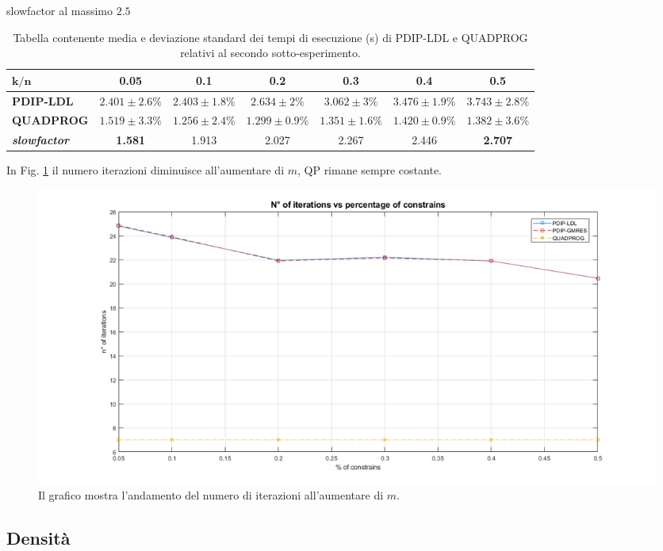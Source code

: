 slowfactor al massimo $2.5$

\begin{table}[!h]
\centering
\begin{tabular}{l|c|c|c|c|c|c}

$\mathbf{k/n}$            & \textbf{0.05} & \textbf{0.1} & \textbf{0.2} & \textbf{0.3} & \textbf{0.4} & \textbf{0.5} \\ \hline
\textbf{PDIP-LDL}                    & $2.401 \pm 2.6\%$       & $2.403 \pm 1.8\%$       & $2.634     \pm 2\%$   & $3.062 \pm 3\%$      & $3.476 \pm 1.9\%$      & $3.743 \pm 2.8\%$       \\
\textbf{QUADPROG}                    & $1.519 \pm 3.3\%$       & $1.256 \pm 2.4\%$       & $1.299 \pm 0.9\%$       & $1.351 \pm 1.6\%$       & $1.420 \pm 0.9\%$       & $1.382 \pm 3.6\%$       \\
\textbf{\textit{slowfactor}} &\textbf{1.581}        & 1.913       & 2.027       & 2.267       & 2.446       & \textbf{2.707} 
\end{tabular}
\caption{Tabella contenente media e deviazione standard dei tempi di esecuzione (s) di PDIP-LDL e QUADPROG relativi al secondo sotto-esperimento.\label{tab:ldlqp2}}
\end{table}

In Fig. \ref{fig:exp2.2} il numero iterazioni diminuisce all'aumentare di $m$, QP rimane sempre costante.


\begin{figure}[!h]
    \centering
    \includegraphics[width=\textwidth]{img/MU8.png}
    \caption{Il grafico mostra l'andamento del numero di iterazioni all'aumentare di $m$. \label{fig:exp2.2}}
\end{figure}


\subsection*{Densità}

